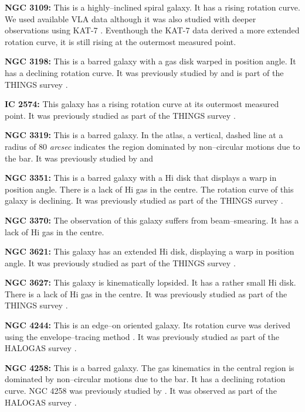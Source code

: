 \documentclass[usenatbib,useAMS]{mnras}
\begin{document}
\textbf{NGC 3109:} This is a highly--inclined spiral galaxy.  It has a
rising rotation curve.  We used available VLA data although it was also
studied with deeper observations using KAT-7 \citep{ngc3109}. 
Eventhough the KAT-7 data derived a more extended rotation curve, it is
still rising at the outermost measured point. 
 
\textbf{NGC 3198:} This is a barred galaxy with a gas disk warped in
position angle.  It has a declining rotation curve.  It was previously
studied by \citet{bosma81, begeman89} and is part of the THINGS survey
\citep{deblok08, things}. 
  
\textbf{IC 2574:} This galaxy has a rising rotation curve at its
outermost measured point.  It was previously studied as part of the
THINGS survey \citep{deblok08, things, oh08}. 
  
\textbf{NGC 3319:} This is a barred galaxy.  In the atlas, a vertical,
dashed line at a radius of 80 {\it arcsec} indicates the region
dominated by non--circular motions due to the bar.  It was previously
studied by \citet{ngc3319} and \citet{ngc3319a}
   
\textbf{NGC 3351:} This is a barred galaxy with a H{\sc i} disk that
displays a warp in position angle.  There is a lack of H{\sc i} gas in
the centre.  The rotation curve of this galaxy is declining.  It was
previously studied as part of the THINGS survey \citep{deblok08,
things}. 
   
\textbf{NGC 3370:} The observation of this galaxy suffers from
beam--smearing.  It has a lack of H{\sc i} gas in the centre. 
    
\textbf{NGC 3621:} This galaxy has an extended H{\sc i} disk, displaying
a warp in position angle.  It was previously studied as part of the
THINGS survey \citep{deblok08, things}. 
   
\textbf{NGC 3627:} This galaxy is kinematically lopsided.  It has a
rather small H{\sc i} disk.  There is a lack of H{\sc i} gas in the
centre.  It was previously studied as part of the THINGS survey
\citep{deblok08, things}. 
   
\textbf{NGC 4244:} This is an edge--on oriented galaxy.  Its rotation
curve was derived using the envelope--tracing method
\citep{sancisiallen}.  It was previously studied as part of the HALOGAS
survey \citep{ngc4244,halogas}. 
   
\textbf{NGC 4258:} This is a barred galaxy.  The gas kinematics in the
central region is dominated by non--circular motions due to the bar.  It
has a declining rotation curve.  NGC 4258 was previously studied by
\citet{ngc4258}.  It was observed as part of the HALOGAS survey
\citep{halogas}. 
   
\end{document}
